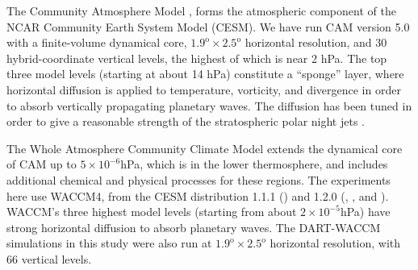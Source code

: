 The Community Atmosphere Model \citep[CAM]{nealeetal2010}, forms the atmospheric component of the NCAR Community Earth System Model (CESM). 
We have run CAM version 5.0 with a finite-volume dynamical core, $1.9^{\text{o}} \times 2.5^{\text{o}}$ horizontal resolution, and  30 hybrid-coordinate vertical levels, the highest of which is near 2 hPa.
The top three model levels (starting at about 14 hPa) constitute a ``sponge'' layer, where horizontal diffusion is applied to temperature, vorticity, and divergence in order to absorb vertically propagating planetary waves.  
The diffusion has been tuned in order to give a reasonable strength of the stratospheric polar night jets \citep{nealeetal2010}.

The Whole Atmosphere Community Climate Model \citep[WACCM]{Marsh2013} extends the dynamical core of CAM up to $5 \times 10^{-6}$hPa, which is in the lower thermosphere, and includes additional chemical and physical processes for these regions. 
The experiments here use WACCM4, from the CESM distribution 1.1.1 (\NCARFULL) and 1.2.0 (\WACCMNODA, \WACCMTROPICS, and \WACCMGLOBAL). 
WACCM's three highest model levels (starting from about $2 \times 10^{-5}$hPa) have strong horizontal diffusion to absorb planetary waves. 
The DART-WACCM simulations in this study were also run at $1.9^{\text{o}} \times 2.5^{\text{o}}$ horizontal resolution, with 66 vertical levels. 

